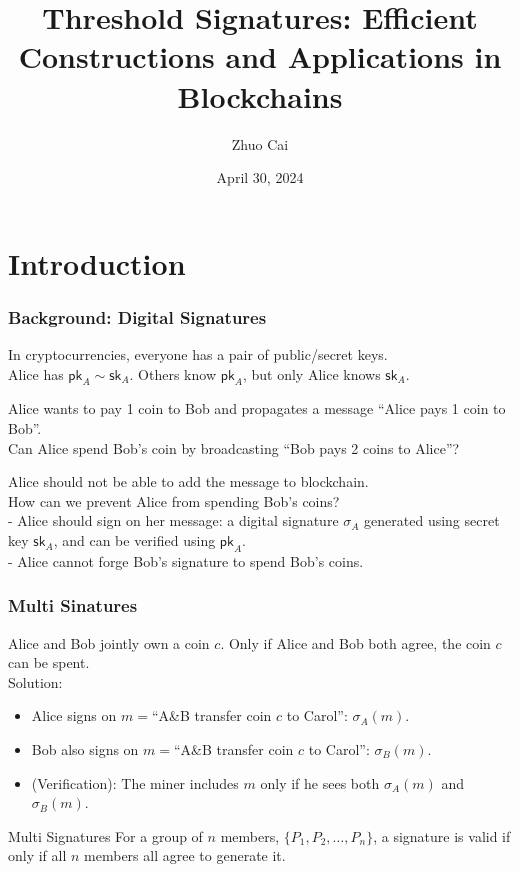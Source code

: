 \documentclass[10pt]{beamer}
\title{Threshold Signatures: Efficient Constructions and Applications in Blockchains}
\author{Zhuo Cai}
\institute{PQE of Department of Computer Science, HKUST}
\date{April 30, 2024}
\begin{document}
\frame{\titlepage}


\section{Introduction}
\begin{frame}
\frametitle{Background: Digital Signatures}

In cryptocurrencies, everyone has a pair of public/secret keys. \\
Alice has $\mathsf{pk}_A \sim \mathsf{sk}_A$.  Others know $\mathsf{pk}_A$, but only Alice knows $\mathsf{sk}_A$. \\
\begin{examples}
    Alice wants to pay 1 coin to Bob and propagates a message ``Alice pays 1 coin to Bob''. \\
    Can Alice spend Bob's coin by broadcasting ``Bob pays 2 coins to Alice''? \\
\end{examples}
\pause
Alice should not be able to add the message to blockchain. \\ \pause
\vspace{1em}
How can we prevent Alice from spending Bob's coins? \\ \pause
- Alice should sign on her message: a digital signature $\sigma_A$ generated using secret key $\mathsf{sk}_A$, and can be verified using $\mathsf{pk}_A$. \\ \pause
- Alice cannot forge Bob's signature to spend Bob's coins. 

\end{frame}


\begin{frame}
\frametitle{Multi Sinatures}
Alice and Bob jointly own a coin $c$. Only if Alice and Bob both agree, the coin $c$ can be spent. \\ \pause
Solution: 
\begin{itemize}
    \item Alice signs on $m=$``A\&B transfer coin $c$ to Carol'': $\sigma_A(m)$. 
    \item Bob also signs on $m=$``A\&B transfer coin $c$ to Carol'': $\sigma_B(m)$. 
    \item (Verification): The miner includes $m$ only if he sees both $\sigma_A(m)$ and $\sigma_B(m)$. 
\end{itemize}
\begin{block}{Multi Signatures} 
    For a group of $n$ members, $\{P_1, P_2,\dots, P_n\}$, a signature is valid if only if all $n$ members all agree to generate it.  
\end{block}
\end{frame}
\end{document}
